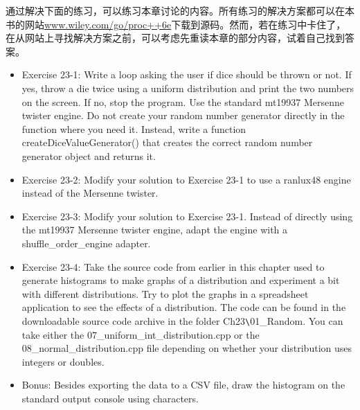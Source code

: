 通过解决下面的练习，可以练习本章讨论的内容。所有练习的解决方案都可以在本书的网站\url{www.wiley.com/go/proc++6e}下载到源码。然而，若在练习中卡住了，在从网站上寻找解决方案之前，可以考虑先重读本章的部分内容，试着自己找到答案。

\begin{itemize}
\item
Exercise 23-1: Write a loop asking the user if dice should be thrown or not. If yes, throw a die twice using a uniform distribution and print the two numbers on the screen. If no, stop the program. Use the standard mt19937 Mersenne twister engine. Do not create your random number generator directly in the function where you need it. Instead, write a function createDiceValueGenerator() that creates the correct random number generator object and returns it.

\item
Exercise 23-2: Modify your solution to Exercise 23-1 to use a ranlux48 engine instead of the Mersenne twister.

\item
Exercise 23-3: Modify your solution to Exercise 23-1. Instead of directly using the mt19937 Mersenne twister engine, adapt the engine with a shuffle\_order\_engine adapter.

\item
Exercise 23-4: Take the source code from earlier in this chapter used to generate histograms to make graphs of a distribution and experiment a bit with different distributions. Try to plot the graphs in a spreadsheet application to see the effects of a distribution. The code can be found in the downloadable source code archive in the folder Ch23\verb|\|01\_Random. You can take either the 07\_uniform\_int\_distribution.cpp or the 08\_normal\_distribution.cpp file depending on whether your distribution uses integers or doubles.

\item
Bonus: Besides exporting the data to a CSV file, draw the histogram on the standard output console using characters.
\end{itemize}













